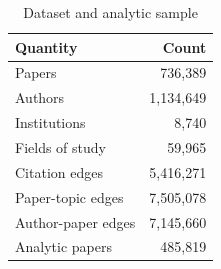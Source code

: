 \begin{table}[!htbp]\centering
\caption{Dataset and analytic sample}
\label{tab:data}
\begin{tabular}{lr}
\toprule
Quantity & Count \\
\midrule
Papers & 736,389 \\
Authors & 1,134,649 \\
Institutions & 8,740 \\
Fields of study & 59,965 \\
Citation edges & 5,416,271 \\
Paper-topic edges & 7,505,078 \\
Author-paper edges & 7,145,660 \\
Analytic papers & 485,819 \\
\bottomrule
\end{tabular}
\end{table}
